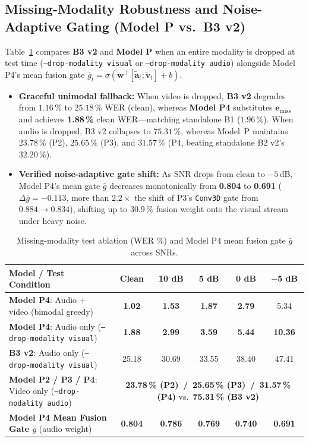 \documentclass[11pt,a4paper]{article}
\newcommand{\code}[1]{\texttt{\small #1}}
\begin{document}
\subsection{Missing-Modality Robustness and Noise-Adaptive Gating (Model P vs.\ B3 v2)}
Table~\ref{tab:ablation} compares \textbf{B3 v2} and \textbf{Model P} when an entire modality is dropped at test time (\code{--drop-modality visual} or \code{--drop-modality audio}) alongside Model P4's mean fusion gate $\bar{g}_t = \sigma(\mathbf{w}^\top [\tilde{\mathbf{a}}_t; \tilde{\mathbf{v}}_t] + b)$.
\begin{itemize}
  \item \textbf{Graceful unimodal fallback:} When video is dropped, \textbf{B3 v2} degrades from $1.16\,\%$ to $25.18\,\%$ WER (clean), whereas \textbf{Model P4} substitutes $\mathbf{e}_{\text{miss}}$ and achieves \textbf{1.88\,\%} clean WER---matching standalone B1 ($1.96\,\%$). When audio is dropped, B3 v2 collapses to $75.31\,\%$, whereas Model~P maintains $23.78\,\%$ (P2), $25.65\,\%$ (P3), and $31.57\,\%$ (P4, beating standalone B2 v2's $32.20\,\%$).
  \item \textbf{Verified noise-adaptive gate shift:} As SNR drops from $\text{clean}$ to $-5$\,dB, Model P4's mean gate $\bar{g}$ decreases monotonically from \textbf{0.804} to \textbf{0.691} ($\Delta\bar{g} = -0.113$, more than $2.2{\times}$ the shift of P3's \code{Conv3D} gate from $0.884 \to 0.834$), shifting up to $30.9\,\%$ fusion weight onto the visual stream under heavy noise.
\end{itemize}

\begin{table}[htbp]
\centering\small
\caption{Missing-modality test ablation (WER \%) and Model P4 mean fusion gate $\bar{g}$ across SNRs.}
\label{tab:ablation}
\begin{tabularx}{\textwidth}{@{}Xccccc@{}}
\toprule
\rowcolor{white}\sffamily\bfseries Model / Test Condition & \textbf{Clean} & \textbf{10 dB} & \textbf{5 dB} & \textbf{0 dB} & \textbf{$-$5 dB} \\
\midrule
\textbf{Model P4}: Audio + video (bimodal greedy) & \textbf{1.02} & \textbf{1.53} & \textbf{1.87} & \textbf{2.79} & 5.34 \\
\textbf{Model P4}: Audio only (\code{--drop-modality visual}) & \textbf{1.88} & \textbf{2.99} & \textbf{3.59} & \textbf{5.44} & \textbf{10.36} \\
\textbf{B3 v2}: Audio only (\code{--drop-modality visual}) & 25.18 & 30.69 & 33.55 & 38.40 & 47.41 \\
\textbf{Model P2 / P3 / P4}: Video only (\code{--drop-modality audio}) & \multicolumn{5}{c}{\textbf{23.78\,\% (P2) \,/\, 25.65\,\% (P3) \,/\, 31.57\,\% (P4)} \quad vs.\ \textbf{75.31\,\% (B3 v2)}} \\
\midrule
\textbf{Model P4 Mean Fusion Gate $\bar{g}$} (audio weight) & \textbf{0.804} & \textbf{0.786} & \textbf{0.769} & \textbf{0.740} & \textbf{0.691} \\
\bottomrule
\end{tabularx}
\end{table}
\end{document}
